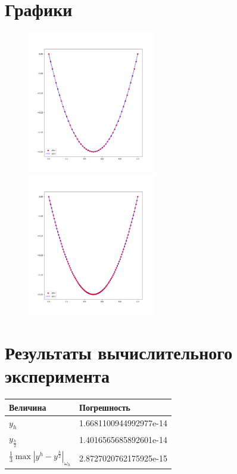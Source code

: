 \documentclass{article}
\begin{document}
\section*{Графики}
\begin{figure}[H]
\includegraphics[width=0.5\textwidth]{Figure_1.png}
\includegraphics[width=0.5\textwidth]{Figure_2.png}
\end{figure}

\section*{Результаты вычислительного эксперимента}
\begin{tabular}[H]{|l|l|}
  \hline
  Величина & Погрешность \\
  \hline
  $y_{h}$ &  1.6681100944992977e-14 \\
  $y_{\frac{h}{2}}$ &  1.4016565685892601e-14  \\
  $\frac{1}{3} \max \left|y^h - y^{\frac{h}{2}}\right|_{\omega_h}$ & 2.8727020762175925e-15 \\
  \hline
\end{tabular} 
\end{document}

